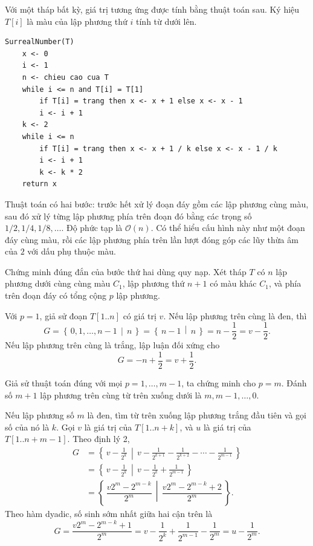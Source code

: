 \documentclass[11pt]{article}
\newcommand{\Gpos}[2]{\left\{\,#1\,\middle|\,#2\,\right\}}
\newcommand{\Oh}{\mathcal{O}}
\begin{document}
Với một tháp bất kỳ, giá trị tương ứng được tính bằng thuật toán sau. Ký hiệu
\(T[i]\) là màu của lập phương thứ \(i\) tính từ dưới lên.

\begin{verbatim}
SurrealNumber(T)
    x <- 0
    i <- 1
    n <- chieu cao cua T
    while i <= n and T[i] = T[1]
        if T[i] = trang then x <- x + 1 else x <- x - 1
        i <- i + 1
    k <- 2
    while i <= n
        if T[i] = trang then x <- x + 1 / k else x <- x - 1 / k
        i <- i + 1
        k <- k * 2
    return x
\end{verbatim}

Thuật toán có hai bước: trước hết xử lý đoạn đáy gồm các lập phương cùng màu,
sau đó xử lý từng lập phương phía trên đoạn đó bằng các trọng số
\(1/2,1/4,1/8,\ldots\). Độ phức tạp là \(\Oh(n)\). Có thể hiểu cấu hình này
như một đoạn đáy cùng màu, rồi các lập phương phía trên lần lượt đóng góp các
lũy thừa âm của \(2\) với dấu phụ thuộc màu.

Chứng minh đúng đắn của bước thứ hai dùng quy nạp. Xét tháp \(T\) có \(n\) lập
phương dưới cùng cùng màu \(C_1\), lập phương thứ \(n+1\) có màu khác \(C_1\),
và phía trên đoạn đáy có tổng cộng \(p\) lập phương.

Với \(p=1\), giả sử đoạn \(T[1..n]\) có giá trị \(v\). Nếu lập phương trên
cùng là đen, thì
\[
  G=\Gpos{0,1,\ldots,n-1}{n}
   =\Gpos{n-1}{n}
   =n-\frac12
   =v-\frac12.
\]
Nếu lập phương trên cùng là trắng, lập luận đối xứng cho
\[
  G=-n+\frac12=v+\frac12.
\]

Giả sử thuật toán đúng với mọi \(p=1,\ldots,m-1\), ta chứng minh cho
\(p=m\). Đánh số \(m+1\) lập phương trên cùng từ trên xuống dưới là
\(m,m-1,\ldots,0\).

Nếu lập phương số \(m\) là đen, tìm từ trên xuống lập phương trắng đầu tiên và
gọi số của nó là \(k\). Gọi \(v\) là giá trị của \(T[1..n+k]\), và \(u\) là giá
trị của \(T[1..n+m-1]\). Theo định lý 2,
\[
\begin{aligned}
G
&=\Gpos{v-\frac1{2^k}}
        {v-\frac1{2^{k+1}}-\frac1{2^{k+2}}-\cdots-\frac1{2^{m-1}}}\\
&=\Gpos{v-\frac1{2^k}}
        {v-\frac1{2^k}+\frac1{2^{m-1}}}\\
&=\Gpos{\dfrac{v2^m-2^{m-k}}{2^m}}
        {\dfrac{v2^m-2^{m-k}+2}{2^m}}.
\end{aligned}
\]
Theo hàm dyadic, số sinh sớm nhất giữa hai cận trên là
\[
  G=\frac{v2^m-2^{m-k}+1}{2^m}
   =v-\frac1{2^k}+\frac1{2^{m-1}}-\frac1{2^m}
   =u-\frac1{2^m}.
\]
\end{document}
